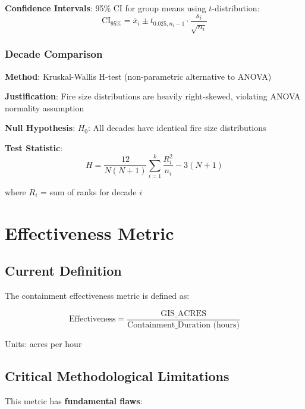 \documentclass[12pt,a4paper]{article}
\begin{document}
\textbf{Confidence Intervals}: 95\% CI for group means using $t$-distribution:
\begin{equation}
\text{CI}_{95\%} = \bar{x}_i \pm t_{0.025, n_i-1} \cdot \frac{s_i}{\sqrt{n_i}}
\end{equation}

\subsubsection{Decade Comparison}

\textbf{Method}: Kruskal-Wallis H-test (non-parametric alternative to ANOVA)

\textbf{Justification}: Fire size distributions are heavily right-skewed, violating ANOVA normality assumption

\textbf{Null Hypothesis}: $H_0$: All decades have identical fire size distributions

\textbf{Test Statistic}:
\begin{equation}
H = \frac{12}{N(N+1)} \sum_{i=1}^{k} \frac{R_i^2}{n_i} - 3(N+1)
\end{equation}

where $R_i$ = sum of ranks for decade $i$

\section{Effectiveness Metric}

\subsection{Current Definition}

The containment effectiveness metric is defined as:

\begin{equation}
\text{Effectiveness} = \frac{\text{GIS\_ACRES}}{\text{Containment\_Duration (hours)}}
\end{equation}

Units: acres per hour

\subsection{Critical Methodological Limitations}

This metric has \textbf{fundamental flaws}:
\end{document}
